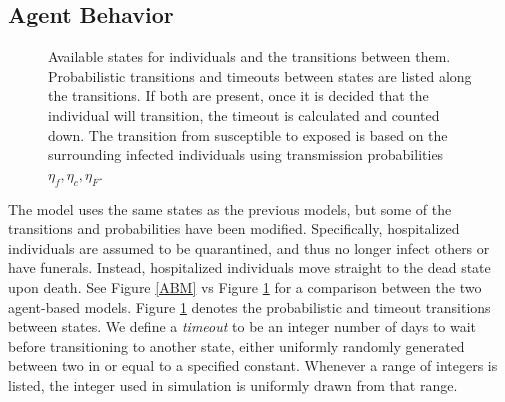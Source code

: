 \subsection{Agent Behavior}
\begin{figure}[h!]
\begin{center}
\end{center}
\caption{Available states for individuals and the transitions between them. Probabilistic transitions and timeouts between states are listed along the transitions. If both are present, once it is decided that the individual will transition, the timeout is calculated and counted down. The transition from susceptible to exposed is based on the surrounding infected individuals using transmission probabilities $\eta_f,\eta_c,\eta_F$.}
\label{fig:sabm-states}
\end{figure}

The model uses the same states as the previous models, but some of the transitions and probabilities have been modified. Specifically, hospitalized individuals are assumed to be quarantined, and thus no longer infect others or have funerals. Instead, hospitalized individuals move straight to the dead state upon death. See Figure \ref{ABM} vs Figure \ref{fig:sabm-states} for a comparison between the two agent-based models. Figure \ref{fig:sabm-states} denotes the probabilistic and timeout transitions between states. We define a \emph{timeout} to be an integer number of days to wait before transitioning to another state, either uniformly randomly generated between two in or equal to a specified constant. Whenever a range of integers is listed, the integer used in simulation is uniformly drawn from that range.

